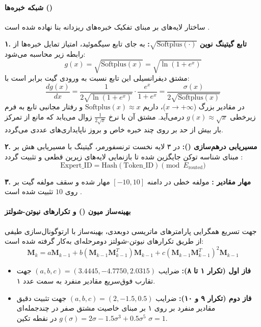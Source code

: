 \paragraph*{شبکه خبره‌ها ()}
ساختار لایه‌های  بر مبنای تفکیک خبره‌های ریزدانه بنا نهاده شده است \cite{dai2024deepseekmoe}.

\textbf{۱. تابع گیتینگ نوین $\sqrt{\text{Softplus}(\cdot)}$:}
به جای تابع سیگموئید، امتیاز تمایل خبره‌ها از رابطه زیر محاسبه می‌شود:
\begin{equation}
    g(x) = \sqrt{\text{Softplus}(x)} = \sqrt{\ln(1 + e^x)}
\end{equation}
مشتق دیفرانسیلی این تابع نسبت به ورودی گیت برابر است با:
\begin{equation}
    \frac{dg(x)}{dx} = \frac{1}{2\sqrt{\ln(1 + e^x)}} \cdot \frac{e^x}{1 + e^x} = \frac{\sigma(x)}{2\sqrt{\text{Softplus}(x)}}
\end{equation}
در مقادیر بزرگ ($x \to +\infty$)، داریم $\text{Softplus}(x) \approx x$ و رفتار مجانبی تابع به فرم زیرخطی $g(x) \approx \sqrt{x}$ درمی‌آید. مشتق آن با نرخ $\frac{1}{2\sqrt{x}}$ زوال می‌یابد که مانع از تمرکز بار بیش از حد بر روی چند خبره خاص و بروز ناپایداری‌های عددی می‌گردد.

\textbf{۲. مسیریابی درهم‌سازی ():}
در ۳ لایه نخست ترنسفورمر، گیتینگ با مسیریابی هش بر مبنای شناسه توکن جایگزین شده تا بازنمایی لایه‌های زیرین قطعی و تثبیت گردد \cite{roller2021hash}:
\begin{equation}
    \text{Expert\_ID} = \text{Hash}(\text{Token\_ID}) \pmod{E_{\text{routed}}}
\end{equation}

\textbf{۳. مهار مقادیر :}
مولفه خطی در دامنه $[-10, 10]$ مهار شده و سقف مولفه گیت بر روی $10$ تثبیت شده است \cite{shazeer2020glu}.

\paragraph*{بهینه‌ساز میون () و تکرارهای نیوتن-شولتز}
جهت تسریع همگرایی پارامترهای ماتریسی دوبعدی، بهینه‌ساز  \cite{jordan2024muon, liu2025muon} با ارتوگونال‌سازی طیفی از طریق تکرارهای نیوتن-شولتز دومرحله‌ای به‌کار گرفته شده است:
\begin{equation}
    \mathbf{M}_k = a \mathbf{M}_{k-1} + b \left(\mathbf{M}_{k-1} \mathbf{M}_{k-1}^T\right) \mathbf{M}_{k-1} + c \left(\mathbf{M}_{k-1} \mathbf{M}_{k-1}^T\right)^2 \mathbf{M}_{k-1}
\end{equation}
\begin{itemize}
    \item \textbf{فاز اول (تکرار ۱ تا ۸):} ضرایب $(a, b, c) = (3.4445, -4.7750, 2.0315)$ جهت تقارب فوق‌سریع مقادیر منفرد به سمت عدد ۱.
    \item \textbf{فاز دوم (تکرار ۹ و ۱۰):} ضرایب $(a, b, c) = (2, -1.5, 0.5)$ جهت تثبیت دقیق مقادیر منفرد بر روی ۱ بر مبنای خاصیت مشتق صفر در چندجمله‌ای $g(\sigma) = 2\sigma - 1.5\sigma^3 + 0.5\sigma^5$ در نقطه تکین $\sigma=1$.
\end{itemize}

